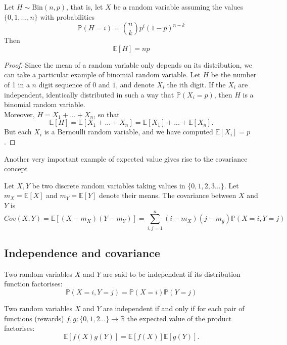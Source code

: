\begin{corollary}
Let $H \sim \textrm{Bin}(n,p)$, that is, let $X$ be a random variable assuming the values $\{0,1,...,n\}$ with probabilities 
$$
\mathbb P(H = i) = {n \choose k} p^{i}(1-p)^{n-k}
$$
Then 
$$\mathbb E[H] = np$$
\end{corollary}

\begin{proof}
Since the mean of a random variable only depends on its distribution, we can take a particular example of binomial random variable. Let $H$ be the number of 1 in a $n$ digit sequence of $0$ and $1$, and denote $X_i$  the ith digit. If the $X_i$ are independent, identically distributed in such a way that $\mathbb P(X_i = p)$, then $H$ is a binomial random variable. \\
Moreover, $ H = X_1 +...+ X_n$, so that 
$$\mathbb E[H] = \mathbb E[X_1+...+X_n] = \mathbb E[X_1] + ...+ \mathbb E[X_n].$$
But each $X_i$ is a Bernoulli random variable, and we have computed $\mathbb E[X_i] = p$. 
\end{proof}

Another very important example of expected value gives rise to the covariance concept 

\begin{definition}[Covariance]
Let $X, Y$ be two discrete random variables taking values in $\{0,1,2,3...\}$. Let $m_X = \mathbb E[X]$ and $m_Y = \mathbb E[Y]$ denote their means. The covariance between $X$ and $Y$ is 
\begin{equation}
Cov(X,Y) = \mathbb E[ (X- m_X)(Y-m_Y)] = \sum_{i,j= 1 }^n (i- m_X)(j- m_y) \mathbb P(X = i, Y = j)
\end{equation}
\end{definition}
\subsection{Independence and covariance}

\begin{definition} 
    Two random variables $X$ and $Y$ are said to be independent if its distribution function factorises: 
    \begin{equation}
        \label{e:XYindep}
        \mathbb P(X = i, Y = j) = \mathbb P(X = i ) \mathbb P(Y = j)
        \end{equation}
\end{definition}

\begin{proposition}
Two random variables $X$ and $Y$ are independent if and only if for each pair of functions (rewards) $f,g:\{0,1,2...\} \to \mathbb R $ the expected value of the product factorises: 
\begin{equation}
    \label{e:factor}
\mathbb E[f(X)g(Y)] = \mathbb E[f(X)]\mathbb E[g(Y)].
\end{equation}

\end{proposition}


